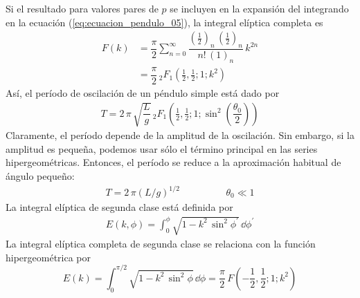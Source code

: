 Si el resultado para valores pares de $p$ se incluyen en la expansión del integrando en la ecuación (\ref{eq:ecuacion_pendulo_05}), la integral elíptica completa es
\begin{align*}
F(k) &= \dfrac{\pi}{2} \sum_{n=0}^{\infty} \dfrac{\left(\frac{1}{2} \right)_{n} \, \left(\frac{1}{2} \right)_{n}}{n! \, (1)_{n}} \, k^{2n} \\
&= \dfrac{\pi}{2} \, {}_{2} F_{1} (\frac{1}{2}, \frac{1}{2}; 1; k^{2})
\end{align*}
Así, el período de oscilación de un péndulo simple está dado por
\begin{align*}
T = 2 \, \pi \, \sqrt{\dfrac{L}{g}} \, {}_{2} F_{1} \left(\frac{1}{2}, \frac{1}{2}; 1; \sin^{2} \left( \dfrac{\theta_{0}}{2} \right) \right)
\end{align*}
Claramente, el período depende de la amplitud de la oscilación. Sin embargo, si la amplitud es pequeña, podemos usar sólo el término principal en las series hipergeométricas. Entonces, el período se reduce a la aproximación habitual de ángulo pequeño:
\begin{align*}
T = 2 \, \pi (L / g)^{1/2} \hspace{2cm} \theta_{0} \ll 1
\end{align*}
La integral elíptica de segunda clase está definida por
\begin{align*}
E (k, \phi) = \int_{0}^{\phi} \sqrt{1 - k^{2} \, \sin^{2} \phi^{\prime}} \, \dd{\phi^{\prime}}
\end{align*}
La integral elíptica completa de segunda clase se relaciona con la función hipergeométrica por
\begin{equation}
E(k) = \int_{0}^{\pi/2} \sqrt{1 - k^{2} \, \sin^{2} \phi} \, \dd{\phi} =  \dfrac{\pi}{2} \, F \left( -\frac{1}{2}, \frac{1}{2}; 1; k^{2} \right)
\end{equation}


